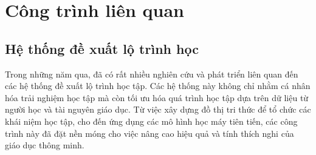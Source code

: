 \chapter{Công trình liên quan}
\section{Hệ thống đề xuất lộ trình học}
Trong những năm qua, đã có rất nhiều nghiên cứu và phát triển liên quan đến các hệ thống đề xuất lộ trình học tập. Các hệ thống này không chỉ nhằm cá nhân hóa trải nghiệm học tập mà còn tối ưu hóa quá trình học tập dựa trên dữ liệu từ người học và tài nguyên giáo dục. Từ việc xây dựng đồ thị tri thức để tổ chức các khái niệm học tập, cho đến ứng dụng các mô hình học máy tiên tiến, các công trình này đã đặt nền móng cho việc nâng cao hiệu quả và tính thích nghi của giáo dục thông minh.
